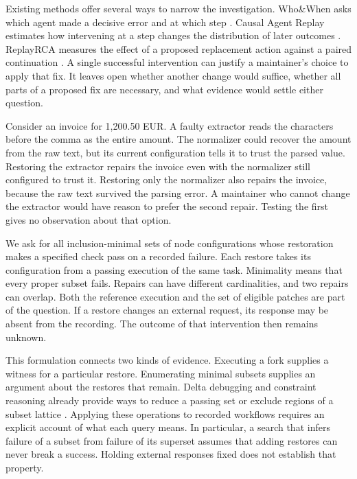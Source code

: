 \documentclass[11pt,letterpaper]{article}
\begin{document}
Existing methods offer several ways to narrow the investigation. Who\&When asks which agent made a decisive error and at which step \cite{zhang}. Causal Agent Replay estimates how intervening at a step changes the distribution of later outcomes \cite{shah}. ReplayRCA measures the effect of a proposed replacement action against a paired continuation \cite{replayrca}. A single successful intervention can justify a maintainer's choice to apply that fix. It leaves open whether another change would suffice, whether all parts of a proposed fix are necessary, and what evidence would settle either question.

Consider an invoice for 1,200.50 EUR. A faulty extractor reads the characters before the comma as the entire amount. The normalizer could recover the amount from the raw text, but its current configuration tells it to trust the parsed value. Restoring the extractor repairs the invoice even with the normalizer still configured to trust it. Restoring only the normalizer also repairs the invoice, because the raw text survived the parsing error. A maintainer who cannot change the extractor would have reason to prefer the second repair. Testing the first gives no observation about that option.

We ask for all inclusion-minimal sets of node configurations whose restoration makes a specified check pass on a recorded failure. Each restore takes its configuration from a passing execution of the same task. Minimality means that every proper subset fails. Repairs can have different cardinalities, and two repairs can overlap. Both the reference execution and the set of eligible patches are part of the question. If a restore changes an external request, its response may be absent from the recording. The outcome of that intervention then remains unknown.

This formulation connects two kinds of evidence. Executing a fork supplies a witness for a particular restore. Enumerating minimal subsets supplies an argument about the restores that remain. Delta debugging and constraint reasoning already provide ways to reduce a passing set or exclude regions of a subset lattice \cite{zeller,previti,mcs}. Applying these operations to recorded workflows requires an explicit account of what each query means. In particular, a search that infers failure of a subset from failure of its superset assumes that adding restores can never break a success. Holding external responses fixed does not establish that property.
\end{document}
